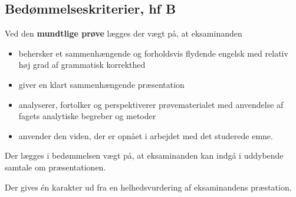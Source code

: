 \documentclass[10pt,a4paper]{article}
\begin{document}
\subsection{Bedømmelseskriterier, hf B}
Ved den \textbf{mundtlige prøve} lægges der vægt på, at eksaminanden
\begin{itemize}
  \item behersker et sammenhængende og forholdsvis flydende engelsk med relativ høj grad af grammatisk korrekthed
  \item giver en klart sammenhængende præsentation
  \item analyserer, fortolker og perspektiverer prøvematerialet med anvendelse af fagets analytiske begreber og metoder
  \item anvender den viden, der er opnået i arbejdet med det studerede emne.
\end{itemize}
Der lægges i bedømmelsen vægt på, at eksaminanden kan indgå i uddybende samtale om præsentationen.

Der gives én karakter ud fra en helhedsvurdering af eksaminandens præstation.



\end{document}
